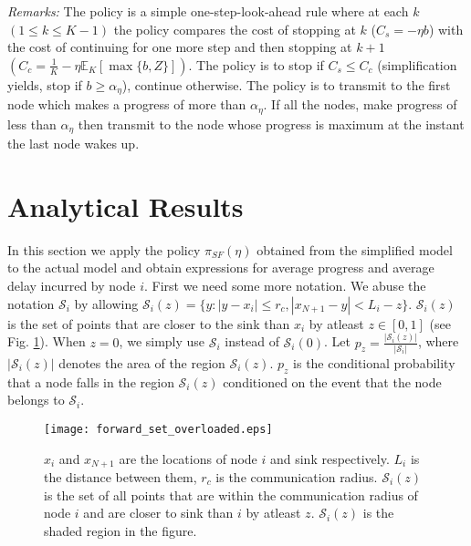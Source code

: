 \documentclass[onecolumn]{IEEEtran}
\begin{document}
\noindent
\emph{Remarks:} The policy is a simple one-step-look-ahead rule where
at each $k$ $(1\le k\le K-1)$ the policy compares the cost of stopping
at $k$ ($C_s=-\eta b$) with the cost of continuing for one more step
and then stopping at $k+1$
$(C_c=\frac{1}{K}-\eta\mathbb{E}_K[\max\{b,Z\}])$. The policy is to stop
if $C_s \le C_c$ (simplification yields, stop if $b\ge\alpha_\eta$),
continue otherwise.  The policy is to transmit to the first node which
makes a progress of more than $\alpha_\eta$. If all the nodes, make
progress of less than $\alpha_\eta$ then transmit to the node whose
progress is maximum at the instant the last node wakes up.
\section{Analytical Results}
\label{analytical_results}
In this section we apply the policy $\pi_{SF}(\eta)$ obtained from the
simplified model to the actual model and  obtain  expressions for 
average progress and average delay incurred by node $i$.  First we need 
some more notation. We abuse the notation $\mathcal{S}_i$ by allowing 
 $\mathcal{S}_i(z)=\{y:|y-x_i|\le r_c, |x_{N+1}-y|<L_i-z\}$. $\mathcal{S}_i(z)$ 
is the set of points that are closer to  the sink than $x_i$ by atleast $z\in[0,1]$ (see Fig. \ref{forwardsetoverloaded_figu}).  When $z=0$, we simply use  $\mathcal{S}_i$ instead of $\mathcal{S}_i(0)$. Let $p_z=\frac{|\mathcal{S}_i(z)|}{|\mathcal{S}_i|}$, where $|\mathcal{S}_i(z)|$ denotes the area of the region $\mathcal{S}_i(z)$. $p_z$ is the conditional probability that a node falls in the region $\mathcal{S}_i(z)$ conditioned on the event that the node belongs to $\mathcal{S}_i$.
\begin{figure}[ht]
\centering
\texttt{[image: forward\_set\_overloaded.eps]}
\caption{$x_i$ and $x_{N+1}$ are the locations of node $i$ and sink
  respectively. $L_i$ is the distance between them, $r_c$ is the
  communication radius.  $\mathcal{S}_i(z)$ is the set of all points that
  are within the communication radius of node $i$ and are closer to sink
  than $i$ by atleast $z$. $\mathcal{S}_i(z)$ is the shaded region in the figure.
  \label{forwardsetoverloaded_figu}}
\end{figure}
\end{document}
